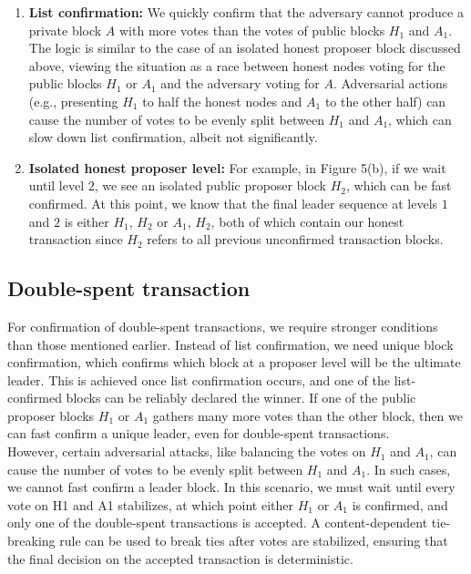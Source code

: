 \documentclass{report}
\begin{document}
\begin{enumerate}
	\item \textbf{List confirmation:} We quickly confirm that the adversary cannot produce a private block $A$ with more votes than the votes of public blocks $H_{1}$ and $A_{1}$. The logic is similar to the case of an isolated honest proposer block discussed above, viewing the situation as a race between honest nodes voting for the public blocks $H_{1}$ or $A_{1}$ and the adversary voting for $A$. Adversarial actions (e.g., presenting $H_{1}$ to half the honest nodes and $A_{1}$ to the other half) can cause the number of votes to be evenly split between $H_{1}$ and $A_{1}$, which can slow down list confirmation, albeit not significantly.
	\item \textbf{Isolated honest proposer level:} For example, in Figure 5(b), if we wait until level $2$, we see an isolated public proposer block $H_{2}$, which can be fast confirmed. At this point, we know that the final leader sequence at levels $1$ and $2$ is either $H_{1}$, $H_{2}$ or $A_{1}$, $H_{2}$, both of which contain our honest transaction since $H_{2}$ refers to all previous unconfirmed transaction blocks.
\end{enumerate}
\subsection{Double-spent transaction}
For confirmation of double-spent transactions, we require stronger conditions than those mentioned earlier. Instead of list confirmation, we need unique block confirmation, which confirms which block at a proposer level will be the ultimate leader. This is achieved once list confirmation occurs, and one of the list-confirmed blocks can be reliably declared the winner. If one of the public proposer blocks $H_{1}$ or $A_{1}$ gathers many more votes than the other block, then we can fast confirm a unique leader, even for double-spent transactions.\\
However, certain adversarial attacks, like balancing the votes on $H_{1}$ and $A_{1}$, can cause the number of votes to be evenly split between $H_{1}$ and $A_{1}$. In such cases, we cannot fast confirm a leader block. In this scenario, we must wait until every vote on H1 and A1 stabilizes, at which point either $H_{1}$ or $A_{1}$ is confirmed, and only one of the double-spent transactions is accepted. A content-dependent tie-breaking rule can be used to break ties after votes are stabilized, ensuring that the final decision on the accepted transaction is deterministic.
\end{document}
